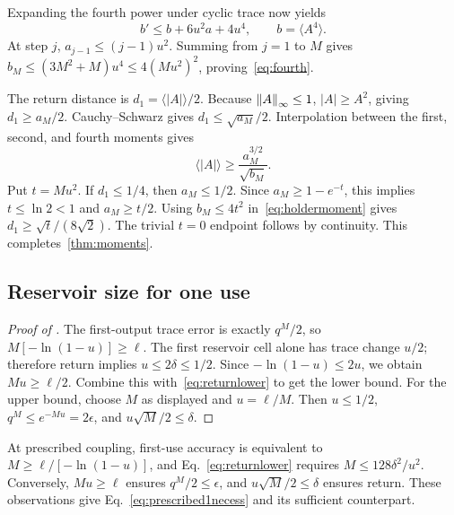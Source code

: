 Expanding the fourth power under cyclic trace now yields
\begin{equation}
 b'\le b+6u^2a+4u^4,
 \qquad b=\langle A^4\rangle.
\end{equation}
At step $j$, $a_{j-1}\le(j-1)u^2$. Summing from $j=1$ to $M$ gives $b_M\le(3M^2+M)u^4\le4(Mu^2)^2$, proving~\eqref{eq:fourth}.

The return distance is $d_1=\langle|A|\rangle/2$. Because $\left\lVert A\right\rVert_\infty\le1$, $|A|\ge A^2$, giving $d_1\ge a_M/2$. Cauchy--Schwarz gives $d_1\le\sqrt{a_M}/2$. Interpolation between the first, second, and fourth moments gives
\begin{equation}
 \langle|A|\rangle\ge\frac{a_M^{3/2}}{\sqrt{b_M}}.
 \label{eq:holdermoment}
\end{equation}
Put $t=Mu^2$. If $d_1\le1/4$, then $a_M\le1/2$. Since $a_M\ge1-e^{-t}$, this implies $t\le\ln2<1$ and $a_M\ge t/2$. Using $b_M\le4t^2$ in~\eqref{eq:holdermoment} gives $d_1\ge\sqrt t/(8\sqrt2)$. The trivial $t=0$ endpoint follows by continuity. This completes~\cref{thm:moments}.


\subsection{Reservoir size for one use}
\begin{proof}[Proof of ]
The first-output trace error is exactly $q^M/2$, so $M[-\ln(1-u)]\ge\ell$. The first reservoir cell alone has trace change $u/2$; therefore return implies $u\le2\delta\le1/2$. Since $-\ln(1-u)\le2u$, we obtain $Mu\ge\ell/2$. Combine this with~\eqref{eq:returnlower} to get the lower bound. For the upper bound, choose $M$ as displayed and $u=\ell/M$. Then $u\le1/2$, $q^M\le e^{-Mu}=2\epsilon$, and $u\sqrt M/2\le\delta$.
\end{proof}

At prescribed coupling, first-use accuracy is equivalent to $M\ge\ell/[-\ln(1-u)]$, and Eq.~\eqref{eq:returnlower} requires $M\le128\delta^2/u^2$. Conversely, $Mu\ge\ell$ ensures $q^M/2\le\epsilon$, and $u\sqrt M/2\le\delta$ ensures return. These observations give Eq.~\eqref{eq:prescribed1necess} and its sufficient counterpart.
